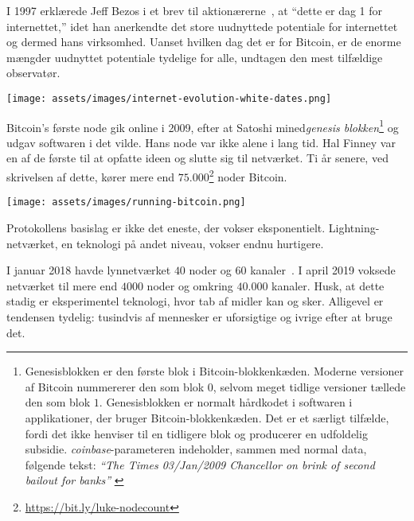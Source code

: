 I 1997 erklærede Jeff Bezos i et brev til aktionærerne~\cite{bezos-letter}, at \enquote{dette er dag 1 for internettet,} idet han anerkendte det store uudnyttede potentiale for internettet og dermed hans virksomhed. Uanset hvilken dag det er for Bitcoin, er de enorme mængder uudnyttet potentiale tydelige for alle, undtagen den mest tilfældige observatør.

\begin{center}
  \texttt{[image: assets/images/internet-evolution-white-dates.png]}
  \label{fig:internet-evolution-white-dates}
\end{center}

Bitcoin's første node gik online i 2009, efter at Satoshi mined ​​\textit{genesis
blokken}\footnote{Genesisblokken er den første blok i Bitcoin-blokkenkæden.
Moderne versioner af Bitcoin nummererer den som blok $0$, selvom meget tidlige versioner
tællede den som blok $1$. Genesisblokken er normalt hårdkodet i
softwaren i applikationer, der bruger Bitcoin-blokkenkæden. Det er et
særligt tilfælde, fordi det ikke henviser til en tidligere blok og producerer en
udfoldelig subsidie. \textit{coinbase}-parameteren indeholder, sammen med
normal data, følgende tekst: \textit{\enquote{The Times 03/Jan/2009 Chancellor on
brink of second bailout for banks}} \cite{btcwiki:genesis-block}} og udgav
softwaren i det vilde. Hans node var ikke alene i lang tid. Hal Finney var en
af de første til at opfatte ideen og slutte sig til netværket. Ti år
senere, ved skrivelsen af dette, kører mere end
$75.000$\footnote{\url{https://bit.ly/luke-nodecount}} noder Bitcoin.

\begin{center}
  \centering
  \texttt{[image: assets/images/running-bitcoin.png]}
  \label{fig:running-bitcoin}
\end{center}

Protokollens basislag er ikke det eneste, der vokser eksponentielt.
Lightning-netværket, en teknologi på andet niveau, vokser endnu
hurtigere.

I januar 2018 havde lynnetværket $40$ noder og $60$
kanaler~\cite{web:lightning-nodes}. I april 2019 voksede netværket til mere
end $4000$ noder og omkring $40.000$ kanaler. Husk, at dette stadig er
eksperimentel teknologi, hvor tab af midler kan og sker. Alligevel er tendensen
tydelig: tusindvis af mennesker er uforsigtige og ivrige efter at bruge det.

